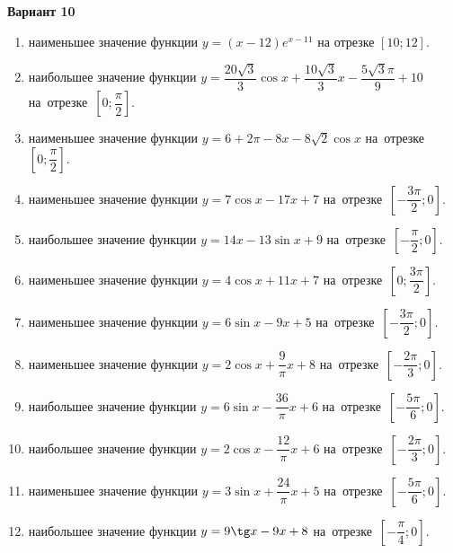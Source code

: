 \documentclass[a4paper,10pt]{article}
\begin{document}
\begin{center}\Large\textbf{Вариант 10}\end{center}

\begin{enumerate}
\item {} наименьшее значение функции $y=\left(x-12\right)e^{x-11}$ на отрезке $\left[10;12\right]$.

\item {} наибольшее значение функции $y=\dfrac{20\sqrt{3}}{3}\cos x+\dfrac{10\sqrt{3}}{3}x-\dfrac{5\sqrt{3}\pi }{9}+10$ на~отрезке~$\left[0;\dfrac{\pi }{2}\right]$.

\item {} наименьшее значение функции $y=6+2\pi -8x-8\sqrt{2}\cos x$ на~отрезке~$\left[0;\dfrac{\pi }{2}\right]$.

\item {} наименьшее значение функции $y=7\cos x-17x+7$ на~отрезке~$\left[-\dfrac{3\pi }{2};0\right]$.

\item {} наибольшее значение функции $y=14x-13\sin x+9$ на~отрезке~$\left[-\dfrac{\pi }{2};0\right]$.

\item {} наименьшее значение функции $y=4\cos x+11x+7$ на~отрезке~$\left[0;\dfrac{3\pi }{2}\right]$.

\item {} наименьшее значение функции $y=6\sin x-9x+5$ на~отрезке~$\left[-\dfrac{3\pi }{2};0\right]$.

\item {} наименьшее значение функции $y=2\cos x+\dfrac{9}{\pi }x+8$ на~отрезке~$\left[-\dfrac{2\pi }{3};0\right]$.

\item {} наибольшее значение функции $y=6\sin x-\dfrac{36}{\pi }x+6$ на~отрезке~$\left[-\dfrac{5\pi }{6};0\right]$.

\item {} наибольшее значение функции $y=2\cos x-\dfrac{12}{\pi }x+6$ на~отрезке~$\left[-\dfrac{2\pi }{3};0\right]$.

\item {} наименьшее значение функции $y=3\sin x+\dfrac{24}{\pi }x+5$ на~отрезке~$\left[-\dfrac{5\pi }{6};0\right]$.

\item {} наибольшее значение функции $y=9\tg x-9x+8$ на~отрезке~$\left[-\dfrac{\pi }{4};0\right]$.


\end{enumerate}
\end{document}

